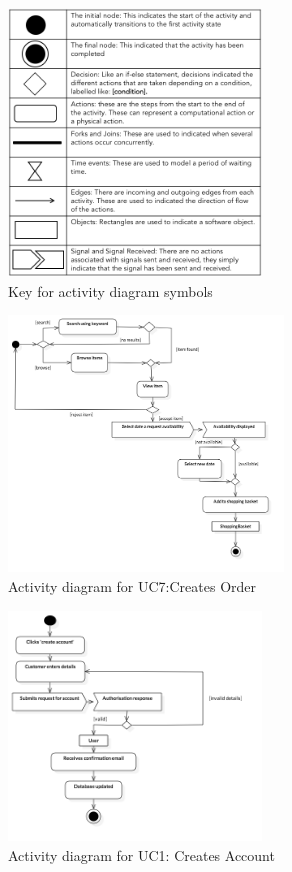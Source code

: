 \begin{figure}[H]
      \centering
      \includegraphics[trim = 0 0 0 0, clip, width=0.6\textwidth]{TempImg/ADKey.png}
      \caption{Key for activity diagram symbols}
 \end{figure}

\begin{figure}[H]
      \centering
      \includegraphics[trim = 0 0 0 0, clip, width=0.65\textwidth]{TempImg/makeOrderAD.png}
      \caption{Activity diagram for UC7:Creates Order}
 \end{figure}

\begin{figure}[H]
      \centering
      \includegraphics[trim = 0 0 0 0, clip, width=0.6\textwidth]{TempImg/newUserAD.png}
      \caption{Activity diagram for UC1: Creates Account}
 \end{figure}

